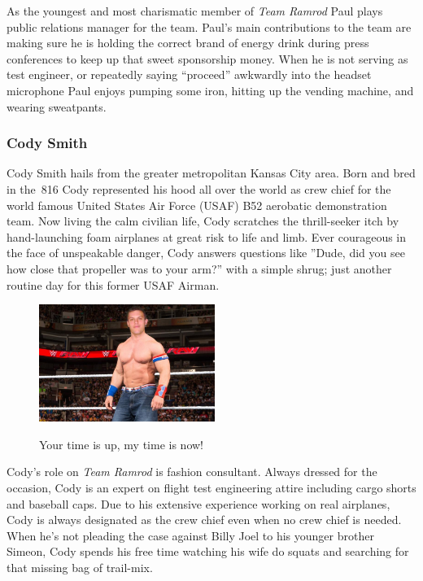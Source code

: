\documentclass[conf]{new-aiaa}
\begin{document}
As the youngest and most charismatic member of \emph{Team Ramrod} Paul plays public relations manager for the team. Paul's main contributions to the team are making sure he is holding the correct brand of energy drink during press conferences to keep up that sweet sponsorship money. When he is not serving as test engineer, or repeatedly saying ``proceed'' awkwardly into the headset microphone Paul enjoys pumping some iron, hitting up the vending machine, and wearing sweatpants.

\subsubsection{Cody Smith}

Cody Smith hails from the greater metropolitan Kansas City area. Born and bred in the~\num{816} Cody represented his hood all over the world as crew chief for the world famous United States Air Force (USAF) B52 aerobatic demonstration team. Now living the calm civilian life, Cody scratches the thrill-seeker itch by hand-launching foam airplanes at great risk to life and limb. Ever courageous in the face of unspeakable danger, Cody answers questions like ''Dude, did you see how close that propeller was to your arm?'' with a simple shrug; just another routine day for this former USAF Airman.

\begin{figure}[hbt!]
	\centering
	\includegraphics[height=1.5in]{CodyCena.jpg}
	\label{PAVSLOGO}
	\caption{Your time is up, my time is now!}
\end{figure}

Cody's role on \emph{Team Ramrod} is fashion consultant. Always dressed for the occasion, Cody is an expert on flight test engineering attire including cargo shorts and baseball caps. Due to his extensive experience working on real airplanes, Cody is always designated as the crew chief even when no crew chief is needed. When he's not pleading the case against Billy Joel to  his younger brother Simeon, Cody spends his free time watching his wife do squats and searching for that missing bag of trail-mix.
\end{document}
